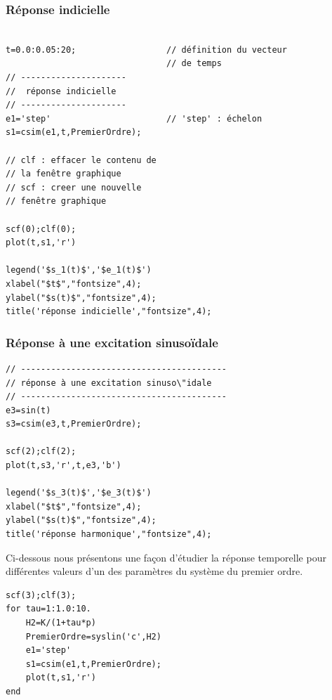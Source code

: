 \subsubsection{Réponse indicielle}
\begin{code}
\begin{verbatim}

t=0.0:0.05:20;                  // définition du vecteur 
                                // de temps
// ---------------------
//  réponse indicielle
// ---------------------
e1='step'                       // 'step' : échelon
s1=csim(e1,t,PremierOrdre);    

// clf : effacer le contenu de
// la fenêtre graphique
// scf : creer une nouvelle 
// fenêtre graphique

scf(0);clf(0);
plot(t,s1,'r')

legend('$s_1(t)$','$e_1(t)$')
xlabel("$t$","fontsize",4);
ylabel("$s(t)$","fontsize",4); 
title('réponse indicielle',"fontsize",4);
\end{verbatim}
\end{code}


\subsubsection{Réponse à une excitation sinuso\"idale}
\begin{code}
\begin{verbatim}
// -----------------------------------------
// réponse à une excitation sinuso\"idale 
// -----------------------------------------
e3=sin(t)
s3=csim(e3,t,PremierOrdre);

scf(2);clf(2);
plot(t,s3,'r',t,e3,'b')

legend('$s_3(t)$','$e_3(t)$')
xlabel("$t$","fontsize",4);
ylabel("$s(t)$","fontsize",4); 
title('réponse harmonique',"fontsize",4);
\end{verbatim}
\end{code}

Ci-dessous nous présentons une façon d'étudier la réponse temporelle pour
différentes valeurs d'un des paramètres du système du premier ordre.
\begin{code}
\begin{verbatim}
scf(3);clf(3);
for tau=1:1.0:10.
    H2=K/(1+tau*p)
    PremierOrdre=syslin('c',H2)
    e1='step'
    s1=csim(e1,t,PremierOrdre);
    plot(t,s1,'r')
end
\end{verbatim}
\end{code}


